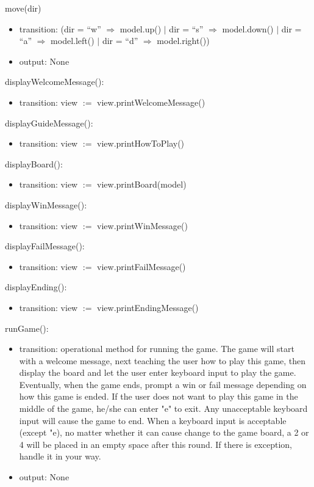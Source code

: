 \documentclass[12pt]{article}
\begin{document}
\noindent move(dir)
\begin{itemize}
\item transition: (dir = ``w'' $\Rightarrow$ model.up() $|$ dir = ``s'' $\Rightarrow$ model.down() $|$ dir = ``a'' $\Rightarrow$ model.left() $|$ dir = ``d'' $\Rightarrow$ model.right())
\item output: None
\end{itemize}

\noindent displayWelcomeMessage():
\begin{itemize}
\item transition: view $:=$ view.printWelcomeMessage()
\end{itemize}

\noindent displayGuideMessage():
\begin{itemize}
\item transition: view $:=$ view.printHowToPlay()
\end{itemize}

\noindent displayBoard():
\begin{itemize}
\item transition: view $:=$ view.printBoard(model)
\end{itemize}

\noindent displayWinMessage():
\begin{itemize}
\item transition: view $:=$ view.printWinMessage()
\end{itemize}

\noindent displayFailMessage():
\begin{itemize}
\item transition: view $:=$ view.printFailMessage()
\end{itemize}

\noindent displayEnding():
\begin{itemize}
\item transition: view $:=$ view.printEndingMessage()
\end{itemize}

\noindent runGame():
\begin{itemize}
\item transition: operational method for running the game. The game will start with a welcome message, next teaching the user how to play this game, then display the board and let the user enter keyboard input to play the game. Eventually, when the game ends, prompt a win or fail message depending on how this game is ended. If the user does not want to play this game in the middle of the game, he/she can enter "e" to exit. Any unacceptable keyboard input will cause the game to end. When a keyboard input is acceptable (except "e), no matter whether it can cause change to the game board, a 2 or 4 will be placed in an empty space after this round. If there is exception, handle it in your way.
\item output: None
\end{itemize}
\end{document}
